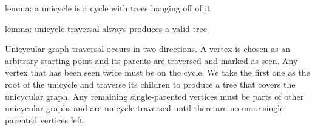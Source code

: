 


lemma: a unicycle is a cycle with trees hanging off of it

lemma: unicycle traversal always produces a valid tree

Unicycular graph traversal occurs in two directions. A vertex is chosen as an arbitrary
starting point and its parents are traversed and marked as seen. Any vertex that
has been seen twice must be on the cycle. We take the first one as the root of
the unicycle and traverse its children to produce a tree that covers the unicycular graph.
Any remaining single-parented vertices must be parts of other unicycular graphs and are
unicycle-traversed until there are no more single-parented vertices left.
